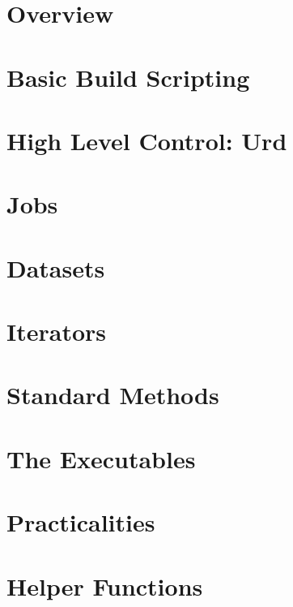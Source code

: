 \documentclass[a4paper]{book}
\begin{document}
\chapter{Overview}


\chapter{Basic Build Scripting}


\chapter{High Level Control:  Urd}


\chapter{Jobs}


\chapter{Datasets}


\chapter{Iterators}


\chapter{Standard Methods}


\chapter{The Executables}


\appendix

\chapter{Practicalities}


\chapter{Helper Functions}



\printindex



\end{document}
